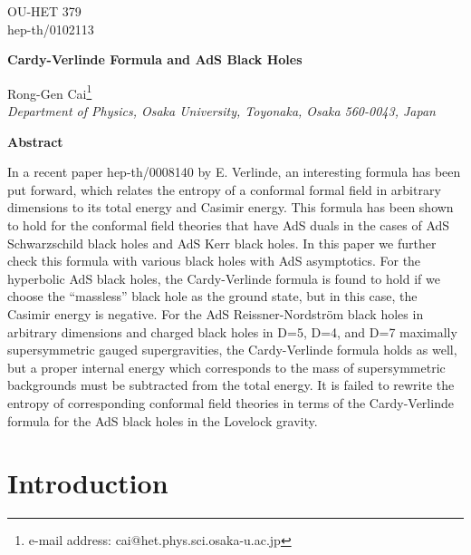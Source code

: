 \documentclass[a4paper,12pt]{article}
\providecommand{\sect}[1]{\setcounter{equation}{0}\section{#1}}
\begin{document}
\topmargin 0pt
\oddsidemargin 0mm

\renewcommand{\thefootnote}{\fnsymbol{footnote}}
\begin{titlepage}
\begin{flushright}
OU-HET 379\\
hep-th/0102113
\end{flushright}

\vspace{5mm}
\begin{center}
{\Large \bf Cardy-Verlinde Formula and AdS Black Holes}
\vspace{12mm}

{\large
Rong-Gen Cai\footnote{e-mail address: cai@het.phys.sci.osaka-u.ac.jp}
} \\
\vspace{8mm}
{\em Department of Physics, Osaka University,
Toyonaka, Osaka 560-0043, Japan} 
\end{center}
\vspace{5mm}
\centerline{{\bf{Abstract}}}
\vspace{5mm}
In a recent paper hep-th/0008140 by E. Verlinde, an interesting formula has 
been put forward, which relates the entropy of a conformal formal field in 
arbitrary dimensions to its total energy and Casimir energy. This formula has
been shown to hold for the conformal field theories that have AdS duals 
in the cases of AdS Schwarzschild black holes and AdS Kerr black holes. In
this paper we further check this formula with various black holes with AdS
asymptotics.  For the hyperbolic AdS black holes, the Cardy-Verlinde formula
is found to hold if we choose the ``massless'' black hole as the ground state,
 but in this case, the Casimir energy is negative. For the AdS 
Reissner-Nordstr\"om black holes in arbitrary dimensions and charged black 
holes in D=5, D=4, and D=7 maximally supersymmetric gauged supergravities,
the Cardy-Verlinde formula holds as well, but a proper internal energy which 
corresponds to the mass of supersymmetric backgrounds must be subtracted from 
the total energy. It is failed to rewrite the entropy of corresponding 
conformal field theories in terms of the Cardy-Verlinde formula for the AdS 
black holes in the Lovelock gravity.   

\end{titlepage}

\newpage
\renewcommand{\thefootnote}{\arabic{footnote}}
\setcounter{footnote}{0}
\setcounter{page}{2}


\sect{Introduction}
\end{document}
